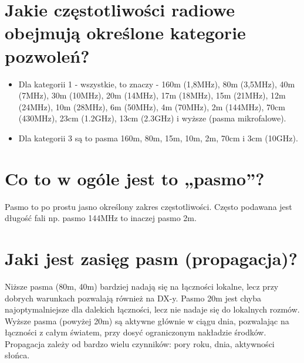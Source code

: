 \documentclass[a4paper,12pt]{article}
\begin{document}
\section{Jakie częstotliwości radiowe obejmują określone kategorie pozwoleń?}
\begin{itemize}
\item Dla kategorii 1 - wszystkie, to znaczy - 160m (1,8MHz), 80m (3,5MHz), 40m (7MHz), 30m (10MHz), 20m (14MHz), 17m (18MHz), 15m (21MHz), 12m (24MHz), 10m (28MHz), 6m (50MHz), 4m (70MHz), 2m (144MHz), 70cm (430MHz), 23cm (1.2GHz), 13cm (2.3GHz) i wyższe (pasma mikrofalowe). 
\item Dla kategorii 3 są to pasma 160m, 80m, 15m, 10m, 2m, 70cm i 3cm (10GHz).\end{itemize}


\section{Co to w ogóle jest to „pasmo”?}
Pasmo to po prostu jasno określony zakres częstotliwości. Często podawana jest długość fali np. pasmo 144MHz to inaczej pasmo 2m.

\section{Jaki jest zasięg pasm (propagacja)?}
Niższe pasma (80m, 40m) bardziej nadają się na łączności lokalne, lecz przy dobrych warunkach pozwalają również na DX-y. Pasmo 20m jest chyba najoptymalniejsze dla dalekich łączności, lecz nie nadaje się do lokalnych rozmów. Wyższe pasma (powyżej 20m) są aktywne głównie w ciągu dnia, pozwalając na łączności z całym światem, przy dosyć ograniczonym nakładzie środków. Propagacja zależy od bardzo wielu czynników: pory roku, dnia, aktywności słońca. 
\end{document}
